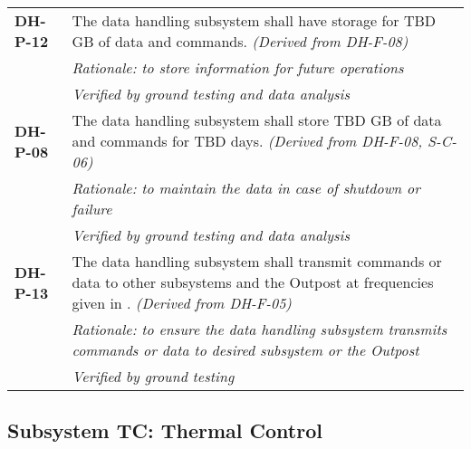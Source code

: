 \begin{longtable}{P{2cm}P{13.25cm}}
\textbf{DH-P-12}	& The data handling subsystem shall have storage for \gls{TBD} \gls{GB} of data and commands.
\textit{(Derived from DH-F-08)} \\
 & \textit{Rationale: to store information for future operations} \\
 & \textit{Verified by ground testing and data analysis}		 									\\
\textbf{DH-P-08}	&     The data handling subsystem shall store \gls{TBD} \gls{GB} of data and commands for TBD days. \textit{(Derived from DH-F-08, S-C-06)}  \\
 & \textit{Rationale: to maintain the data in case of shutdown or failure} \\
 & \textit{Verified by ground testing and data analysis}	\\
 
\textbf{DH-P-13}	&     The data handling subsystem shall transmit commands or data to other subsystems and the Outpost at frequencies given in .
\textit{(Derived from DH-F-05)} \\
 & \textit{Rationale: to ensure the data handling subsystem transmits commands or data to desired subsystem or the Outpost} \\
 & \textit{Verified by ground testing}	
\end{longtable}

\subsection{Subsystem TC: Thermal Control}
\label{req_TC}
